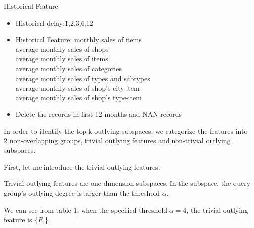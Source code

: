 \documentclass[
 size=12pt,
 paper=smartboard,  %
 mode=present, 		%
 display=slides, 	%
 style=tuliplab,  	%
 pauseslide,
 fleqn,leqno]{powerdot}
\begin{document}
\begin{slide}{Historical Feature}
  \begin{itemize}
    \item
    \smallskip
    Historical delay:1,2,3,6,12
    \item
    Historical Feature:
    \smallskip
  monthly sales of items \\
  average monthly sales of shops \\
  average monthly sales of items  \\
  average monthly sales of categories  \\
  average monthly sales of types and subtypes  \\
  average monthly sales of shop’s city-item   \\
  average monthly sales of shop’s type-item   \\
  \smallskip
    \item
    Delete the records in first 12 months and NAN records
  \end{itemize}
    
    \begin{note}
    In order to identify the top-k outlying subspaces,
    we categorize the features into $2$ non-overlapping groups,
    trivial outlying features and non-trivial outlying subspaces.
    
    First, let me introduce the trivial outlying features.
    
    Trivial outlying features are one-dimension subspaces.
    In the subspace,
    the query group's outlying degree is larger than the threshold $\alpha$.
    
    We can see from table $1$,
    when the specified threshold $\alpha = 4$,
    the trivial outlying feature is \{$F_1$\}.
    \end{note}
    
    \end{slide}

\end{document}
